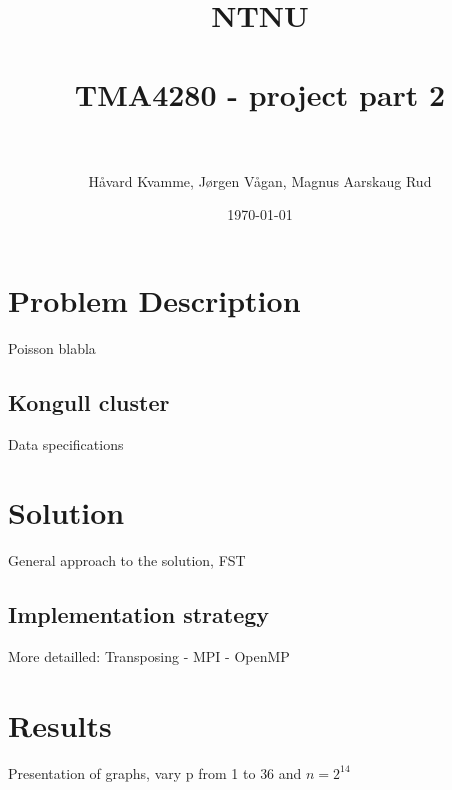 \documentclass[norsk]{article} %
\title{	
\normalfont \normalsize 
\textsc{NTNU} \\ [25pt] %
\horrule{0.5pt} \\[0.4cm] %
\huge TMA4280 - project part 2\\ %
\horrule{2pt} \\[0.5cm] %
}
\author{Håvard Kvamme, Jørgen Vågan, Magnus Aarskaug Rud} %
\date{\normalsize\today} %
\numberwithin{equation}{section} %
\numberwithin{figure}{section} %
\numberwithin{table}{section} %
\begin{document}
\maketitle %


\section{Problem Description}
Poisson blabla 

\subsection{Kongull cluster}
Data specifications

\section{Solution}
General approach to the solution, FST 

\subsection{Implementation strategy}
More detailled: Transposing - MPI - OpenMP

\section{Results}
Presentation of graphs, vary p from 1 to 36
and $n= 2^{14}$
\end{document}
